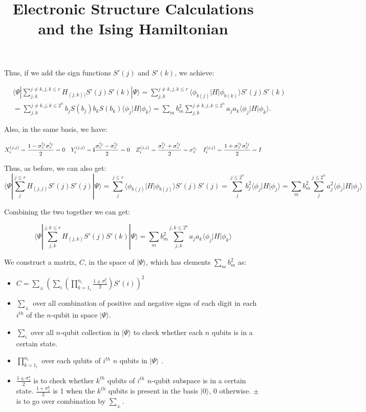 \documentclass{article}
\newcommand\z[1]{\sigma_z^{#1}}\title{Electronic Structure Calculations and the Ising Hamiltonian}
\begin{document}
Thus, if we add the sign functions $S'(j)$ and $S'(k)$, we achieve:

\begin{equation}
\begin{aligned}
&\langle\Psi|\sum_{j,k}^{j\neq k, j,k\leq r}H_{(j,k))}S'(j)S'(k)|\Psi\rangle=\sum_{j,k}^{j\neq k, j,k \leq r}\langle\phi_{b(j)}|H|\phi_{b(k)}\rangle S'(j)S'(k)\\
&=\sum_{j,k}^{j\neq k, j,k\leq 2^n} b_jS(b_j)b_kS(b_k)\langle\phi_j|H|\phi_k\rangle=\sum_mb_m^2\sum_{j,k}^{j\neq k, j,k\leq 2^n} a_ja_k\langle\phi_j|H|\phi_k\rangle .
\end{aligned}
\end{equation}

Also, in the same basis, we have:

\begin{equation}
\begin{aligned}
X_i^{(j,j)}=\frac{1-\z{i_j}\z{i_j}}{2}=0 \quad
Y_i^{(j,j)}={\bf i}\frac{\z{i_j}-\z{i_j}}{2}=0 \quad
Z_i^{(j,j)}=\frac{\z{i_j}+\z{i_j}}{2}=\z{i_j} \quad
I_i^{(j,j)}=\frac{1+\z{i_j}\z{i_j}}{2}=I
\end{aligned}
\end{equation}

Thus, as before, we can also get:
\begin{equation}
\langle\Psi|\sum_{j}^{j\leq r}H_{(j,j)}S'(j)S'(j)|\Psi\rangle=\sum_{j}^{j\leq r}\langle\phi_{b(j)}|H|\phi_{b(j)}\rangle S'(j)S'(j)=\sum_{j}^{j\leq 2^n} b_j^2\langle\phi_j|H|\phi_j\rangle=\sum_mb_m^2\sum_{j}^{j\leq
 2^n} a_j^2\langle\phi_j|H|\phi_j\rangle
\end{equation}

Combining the two together we can get:

\begin{equation}
\langle\Psi|\sum_{j,k}^{j,k\leq r}H_{(j,k)}S'(j)S'(k)|\Psi\rangle=\sum_mb_m^2\sum_{j,k}^{j,k\leq 2^n} a_ja_k\langle\phi_j|H|\phi_k\rangle
\end{equation}

We construct a matrix, $C$, in the space of $|\Psi\rangle$, which has elements $\sum_mb_m^2$ as:

\begin{itemize}
\item $C=\sum_\pm(\sum_i(\prod_{k=1_i}^{n_i}\frac{1\pm\z{k}}{2})S'(i))^2$
\item $\sum_\pm$ over all combination of positive and negative signs of each digit in each $i^{th}$ of the $n$-qubit in space $|\Psi\rangle$.
\item $\sum_i$ over all $n$-qubit collection in $|\Psi\rangle$ to check whether each $n$ qubits is in a certain state.
\item $\prod_{k=1_i}^{n_i}$  over each qubits of $i^{th}$ $n$ qubits in $|\Psi\rangle$ .
\item $\frac{1\pm\z{k}}{2}$ is to check whether $k^{th}$ qubits of $i^{th}$ $n$-qubit subspace is in a certain state. $\frac{1+\z{k}}{2}$ is 1 when the $k^{th}$ qubits is present in the basis $|0\rangle$, 0 otherwise. 
$\pm$ is to go over combination by $\sum_\pm$.
\end{itemize}
\end{document}
